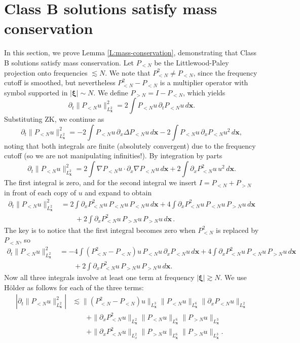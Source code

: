 \documentclass[12pt,letterpaper]{amsart}
\theoremstyle{remark}
\numberwithin{equation}{section}
\numberwithin{theorem}{section}
\numberwithin{table}{section}
\begin{document}
\section{Class B solutions satisfy mass conservation}\label{S:ClassB-mass}
In this section, we prove Lemma \ref{L:mass-conservation}, demonstrating that Class B solutions satisfy mass conservation.     Let $P_{<N}$ be the Littlewood-Paley projection onto frequencies $\lesssim N$.  We note that $P_{<N}^2 \neq P_{<N}$, since the frequency cutoff is smoothed, but nevertheless $P_{<N}^2-P_{<N}$ is a multiplier operator with symbol supported in $|\boldsymbol{\xi}| \sim N$.    We define $P_{>N} = I-P_{<N}$, which yields
$$
\partial_t \| P_{<N} u\|_{L_{\mathbf{x}}^2}^2 = 2 \int P_{<N}u \, \partial_t P_{<N}u \, d\mathbf{x}.
$$
Substituting ZK, we continue as
$$ 
\partial_t \| P_{<N} u\|_{L_{\mathbf{x}}^2}^2 = - 2\int P_{<N} u \, \partial_x \Delta P_{<N}u \, d \mathbf{x} - 2 \int P_{<N} u \, \partial_x P_{<N} u^2 \, d\mathbf{x},
$$
noting that both integrals are finite (absolutely convergent) due to the frequency cutoff (so we are not manipulating infinities!).  By integration by parts
$$ 
\partial_t \| P_{<N} u\|_{L_{\mathbf{x}}^2}^2  =  2\int \nabla P_{<N} u \cdot \partial_x \nabla P_{<N}u \, d \mathbf{x} + 2 \int \partial_x P_{<N}^2 u \, u^2 \, d\mathbf{x}.
$$
The first integral is zero, and for the second integral we insert $I = P_{<N}+P_{>N}$ in front of each copy of $u$ and expand to obtain
\begin{align*}
\partial_t \| P_{<N} u\|_{L_{\mathbf{x}}^2}^2 &=  2 \int \partial_x P_{<N}^2 u \, P_{<N} u \, P_{<N} u \, d\mathbf{x} +  4 \int \partial_x P_{<N}^2 u \, P_{<N} u \, P_{>N} u \, d\mathbf{x} \\
& \qquad +  2 \int \partial_x P_{<N}^2 u \, P_{>N} u \, P_{>N} u \, d\mathbf{x}\,.
\end{align*}
The key is to notice that the first integral becomes zero when $P_{<N}^2$ is replaced by $P_{<N}$, so 
\begin{align*}
\partial_t \| P_{<N} u\|_{L_{\mathbf{x}}^2}^2 &=  -4\int (P_{<N}^2-P_{<N}) u \, P_{<N} u \, \partial_x P_{<N} u \, d\mathbf{x}+  4 \int \partial_x P_{<N}^2 u \, P_{<N} u \, P_{>N} u \, d\mathbf{x} \\
&\qquad + 2 \int \partial_x P_{<N}^2 u \, P_{>N} u \, P_{>N} u \, d\mathbf{x}.
\end{align*}
Now all three integrals involve at least one term at frequency $|\boldsymbol{\xi}| \gtrsim N$.  We use 
H\"older as follows for each of the three terms:
\begin{align*}
\left| \partial_t \| P_{<N} u\|_{L_{\mathbf{x}}^2}^2 \right|  &\lesssim \| (P_{<N}^2-P_{<N}) u \|_{L_{\mathbf{x}}^3} \|P_{<N} u\|_{L_{\mathbf{x}}^6}  \| \partial_x P_{<N} u\|_{L_{\mathbf{x}}^2} \\
&\qquad + \| \partial_x P_{<N}^2 u \|_{L_{\mathbf{x}}^2} \| P_{<N} u \|_{L_{\mathbf{x}}^6} \| P_{>N} u\|_{L_{\mathbf{x}}^3} \\
&\qquad + \| \partial_x P_{<N}^2 u \|_{L_x^2} \| P_{>N} u \|_{L_{\mathbf{x}}^6} \| P_{>N} u\|_{L_{\mathbf{x}}^3}.
\end{align*}
\end{document}
